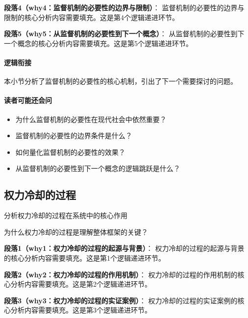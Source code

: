 \documentclass[../main.tex]{subfiles}
\begin{document}
\textbf{段落4（why4：监督机制的必要性的边界与限制）}：
监督机制的必要性的边界与限制的核心分析内容需要填充。这是第4个逻辑递进环节。


\textbf{段落5（why5：从监督机制的必要性到下一个概念）}：
从监督机制的必要性到下一个概念的核心分析内容需要填充。这是第5个逻辑递进环节。


\paragraph*{逻辑衔接}
本小节分析了监督机制的必要性的核心机制，引出了下一个需要探讨的问题。

\paragraph*{读者可能还会问}
\begin{itemize}
\item 为什么监督机制的必要性在现代社会中依然重要？
\item 监督机制的必要性的边界条件是什么？
\item 如何量化监督机制的必要性的效果？
\item 从监督机制的必要性到下一个概念的逻辑跳跃是什么？
\end{itemize}


\subsection{权力冷却的过程}

\begin{motivation}
分析权力冷却的过程在系统中的核心作用
\end{motivation}

\begin{logicmap}
[逻辑链占位]
\end{logicmap}

\begin{questionbox}
为什么权力冷却的过程是理解整体框架的关键？
\end{questionbox}

\textbf{段落1（why1：权力冷却的过程的起源与背景）}：
权力冷却的过程的起源与背景的核心分析内容需要填充。这是第1个逻辑递进环节。


\textbf{段落2（why2：权力冷却的过程的作用机制）}：
权力冷却的过程的作用机制的核心分析内容需要填充。这是第2个逻辑递进环节。


\textbf{段落3（why3：权力冷却的过程的实证案例）}：
权力冷却的过程的实证案例的核心分析内容需要填充。这是第3个逻辑递进环节。
\end{document}
